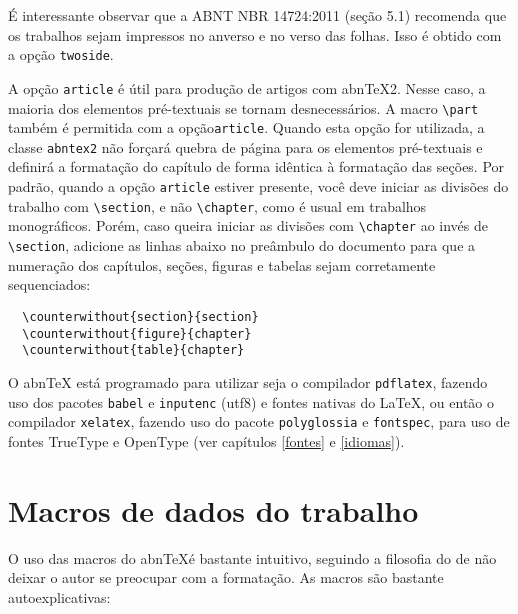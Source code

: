 É interessante observar que a ABNT NBR 14724:2011 (seção 5.1) recomenda que os
trabalhos sejam impressos no anverso e no verso das folhas. Isso é obtido com a
opção \texttt{twoside}. 

A opção \verb+article+ é útil para produção de artigos com abn\TeX 2.
Nesse caso, a maioria dos elementos pré-textuais se tornam desnecessários. A macro \verb+\part+ também é permitida com a opção\texttt{article}. Quando esta opção for
utilizada, a classe \texttt{abntex2} não forçará quebra de página para os
elementos pré-textuais e definirá a formatação do capítulo de forma idêntica à
formatação das seções. Por padrão, quando a opção \texttt{article} estiver presente,
você deve iniciar as divisões do trabalho com \verb+\section+, e não \verb+\chapter+, como
é usual em trabalhos monográficos. Porém, caso queira iniciar as divisões com
\verb+\chapter+ ao invés de \verb+\section+, adicione as linhas abaixo no preâmbulo do
documento para que a numeração dos capítulos, seções, figuras e tabelas sejam
corretamente sequenciados:

\begin{verbatim}
  \counterwithout{section}{section}
  \counterwithout{figure}{chapter}
  \counterwithout{table}{chapter}
\end{verbatim}

O abn\TeX{} está programado para utilizar seja o compilador \texttt{pdflatex}, fazendo uso dos pacotes \texttt{babel} e \texttt{inputenc} (utf8) e fontes nativas do \LaTeX, ou então o compilador \texttt{xelatex}, fazendo uso do pacote \texttt{polyglossia} e \texttt{fontspec}, para uso de fontes TrueType e OpenType (ver capítulos \ref{fontes} e \ref{idiomas}).

\section{Macros de dados do trabalho}\label{sec-macrosdados}
O uso das macros do abn\TeX é bastante intuitivo, seguindo a filosofia do \Latex{} de não deixar o autor se preocupar com a formatação. As macros são bastante autoexplicativas:

